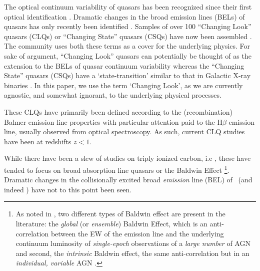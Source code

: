 \documentclass[a4paper,fleqn,usenatbib]{mnras}
\begin{document}
The optical continuum variability of quasars has been recognized since
their first optical identification
\citep[e.g.,][]{MatthewsSandage1963, MacLeod2012}.  Dramatic changes
in the broad emission lines (BELs) of quasars has only recently been
identified \citep[e.g., ][]{LaMassa2015}.  Samples of over 100
``Changing Look'' quasars (CLQs) or ``Changing State'' quasars (CSQs)
have now been assembled \citep[e.g.][]{MacLeod2019,Graham2019}. The
community uses both these terms as a cover for the underlying
physics. For sake of argument, ``Changing Look'' quasars can
potentially be thought of as the extension to the BELs of quasar
continuum variability \citep[e.g., ][]{MacLeod2012} whereas the
``Changing State'' quasars (CSQs) have a `state-transition' similar to
that in Galactic X-ray binaries \citep[][]{NodaDone2018, Ruan2019}. In
this paper, we use the term `Changing Look', as we are currently
agnostic, and somewhat ignorant, to the underlying physical processes.

These CLQs have primarily been defined according to the
(recombination) Balmer emission line properties with particular
attention paid to the H$\beta$ emission line, usually observed from
optical spectroscopy.  As such, current CLQ studies have been at
redshifts $z<1$.

While there have been a slew of studies on triply ionized carbon, i.e
\civ, these have tended to focus on broad absorption line quasars
\citep[BAL QSOs; see Table 1][]{Hemler2019} or the Baldwin Effect
\citep[BEff; ][]{Baldwin1977, Bian2012, Jensen2016,
Hamann2017}\footnote{As noted in \citet{Rakic2017}, two different
types of Baldwin effect are present in the literature: the {\it
global} (or {\it ensemble}) Baldwin Effect, which is an
anti-correlation between the EW of the emission line and the
underlying continuum luminosity of {\it single-epoch} observations of
a {\it large number} of AGN and second, the {\it intrinsic} Baldwin
effect, the same anti-correlation but in an {\it individual, variable}
AGN \citep{PoggePeterson1992}.}.  Dramatic changes in the
collisionally excited broad {\it emission} line (BEL) of \civ\ (and
indeed \ciii) have not to this point been seen.
\end{document}
